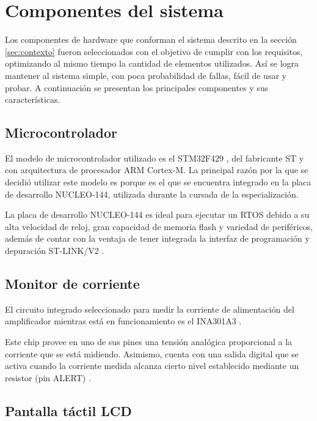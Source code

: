 \section{Componentes del sistema}

Los componentes de hardware que conforman el sistema descrito en la sección \ref{sec:contexto} fueron seleccionados con el objetivo de cumplir con los requisitos, optimizando al mismo tiempo la cantidad de elementos utilizados. Así se logra mantener al sistema simple, con poca probabilidad de fallas, fácil de usar y probar. A continuación se presentan los principales componentes y sus características.

\subsection{Microcontrolador}

El modelo de microcontrolador utilizado es el STM32F429 \citep{STM32F429}, del fabricante ST y con arquitectura de procesador ARM Cortex-M. La principal razón por la que se decidió utilizar este modelo es porque es el que se encuentra integrado en la placa de desarrollo NUCLEO-144, utilizada durante la cursada de la especialización.

La placa de desarrollo NUCLEO-144 es ideal para ejecutar un RTOS debido a su alta velocidad de reloj, gran capacidad de memoria flash y variedad de periféricos, además de contar con la ventaja de tener integrada la interfaz de programación y depuración ST-LINK/V2 \citep{NUCLEO144}.

\subsection{Monitor de corriente}

El circuito integrado seleccionado para medir la corriente de alimentación del amplificador mientras está en funcionamiento es el INA301A3 \citep{INA301}.

Este chip provee en uno de sus pines una tensión analógica proporcional a la corriente que se está midiendo. Asimismo, cuenta con una salida digital que se activa cuando la corriente medida alcanza cierto nivel establecido mediante un resistor (pin ALERT) \citep{INA301}.

\subsection{Pantalla táctil LCD}
\label{sec:pantLCD}

